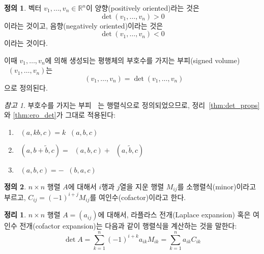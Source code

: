 \documentclass[unfonts,oneside,a4paper]{oblivoir}
\theoremstyle{definition}
\newtheorem{definition}{정의}[section]
\theoremstyle{theorem}
\newtheorem{theorem}{정리}[section]
\theoremstyle{theorem}
\theoremstyle{remark}
\newtheorem*{remark}{참고}
\theoremstyle{remark}
\theoremstyle{remark}
\theoremstyle{remark}
\renewcommand{\vec}[1]{\bm{\mathit{#1}}}
\DeclareMathOperator{\sVol}{\widetilde{Vol}}
\begin{document}
\begin{definition}
    벡터 $\vec v_1, \dots, \vec v_n \in \mathbb R^n$이 양향(positively oriented)라는 것은
    \begin{equation*}
        \det(\vec v_1, \dots, \vec v_n) > 0
    \end{equation*}
    이라는 것이고, 음향(negatively oriented)이라는 것은
    \begin{equation*}
        \det(\vec v_1, \dots, \vec v_n) < 0
    \end{equation*}
    이라는 것이다.
    
    이때 $\vec v_1, \dots, \vec v_n$에 의해 생성되는 평행체의 부호수를 가지는 부피(signed volume) $\sVol(\vec v_1, \dots, \vec v_n)$는
    \begin{equation*}
        \sVol(\vec v_1, \dots, \vec v_n) = \det(\vec v_1, \dots, \vec v_n)
    \end{equation*}
    으로 정의된다.
\end{definition}

\begin{remark}
    부호수를 가지는 부피 $\sVol$는 행렬식으로 정의되었으므로, 정리~\ref{thm:det_props}와 \ref{thm:ero_det}가 그대로 적용된다:
    \begin{enumerate}
        \item $\sVol(\vec a, k \vec b, \vec c) = k \sVol(\vec a, \vec b, \vec c)$
        \item $\sVol(\vec a, \vec b + \tilde{\vec b}, \vec c) = \sVol(\vec a, \vec b, \vec c) + \sVol(\vec a, \tilde{\vec b}, \vec c)$
        \item $\sVol(\vec a, \vec b, \vec c) = -\sVol(\vec b, \vec a, \vec c)$
    \end{enumerate}
\end{remark}

\begin{definition}
    $n \times n$ 행렬 $A$에 대해서 $i$행과 $j$열을 지운 행렬 $M_{ij}$를 소행렬식(minor)이라고 부르고, $C_{ij} = (-1)^{i + j} M_{ij}$를 여인수(cofactor)이라고 한다.
\end{definition}

\begin{theorem}
    $n \times n$ 행렬 $A = (a_{ij})$에 대해서, 라플라스 전개(Laplace expansion) 혹은 여인수 전개(cofactor expansion)는 다음과 같이 행렬식을 계산하는 것을 말한다:
    \begin{equation*}
        \det A = \sum_{k = 1}^n (-1)^{i + k} a_{ik} M_{ik} = \sum_{k = 1}^n a_{ik} C_{ik}
    \end{equation*}
\end{theorem}
\end{document}
